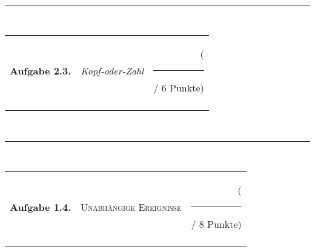 \documentclass[12pt,a4paper,titlepage,xcolor=dvipsnames]{article}
\begin{document}
\\
\vspace*{.2cm}
\noindent\rule{\textwidth}{1pt}
\\
\label{Aufgabe 3}
\noindent
\begin{tabulary}{17cm}{LLR}
\textbf{Aufgabe 2.3.} &\textit{Kopf-oder-Zahl}& ( \rule[-2mm]{5mm}{0.2mm} / 6 Punkte)\\
\hspace{2.8cm} &\hspace{10cm} &\hspace{4cm} 
\end{tabulary}
\noindent


\\
\vspace*{.2cm}
\noindent\rule{\textwidth}{1pt}
\\
\label{Aufgabe 4}
\noindent
\begin{tabulary}{17cm}{LLR}
\textbf{Aufgabe 1.4.} &\textsc{Unabhängige Ereignisse}& ( \rule[-2mm]{5mm}{0.2mm} / 8 Punkte)\\
\hspace{2.8cm} &\hspace{10cm} &\hspace{4cm} 
\end{tabulary}
\noindent


\label{End}
\end{document}

